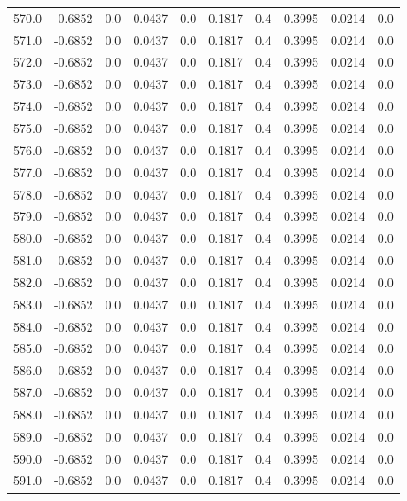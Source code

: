 \begin{longtable}{lrrrrrrrrr}
570.0 & -0.6852 & 0.0 & 0.0437 & 0.0 & 0.1817 & 0.4 & 0.3995 & 0.0214 & 0.0 \\
571.0 & -0.6852 & 0.0 & 0.0437 & 0.0 & 0.1817 & 0.4 & 0.3995 & 0.0214 & 0.0 \\
572.0 & -0.6852 & 0.0 & 0.0437 & 0.0 & 0.1817 & 0.4 & 0.3995 & 0.0214 & 0.0 \\
573.0 & -0.6852 & 0.0 & 0.0437 & 0.0 & 0.1817 & 0.4 & 0.3995 & 0.0214 & 0.0 \\
574.0 & -0.6852 & 0.0 & 0.0437 & 0.0 & 0.1817 & 0.4 & 0.3995 & 0.0214 & 0.0 \\
575.0 & -0.6852 & 0.0 & 0.0437 & 0.0 & 0.1817 & 0.4 & 0.3995 & 0.0214 & 0.0 \\
576.0 & -0.6852 & 0.0 & 0.0437 & 0.0 & 0.1817 & 0.4 & 0.3995 & 0.0214 & 0.0 \\
577.0 & -0.6852 & 0.0 & 0.0437 & 0.0 & 0.1817 & 0.4 & 0.3995 & 0.0214 & 0.0 \\
578.0 & -0.6852 & 0.0 & 0.0437 & 0.0 & 0.1817 & 0.4 & 0.3995 & 0.0214 & 0.0 \\
579.0 & -0.6852 & 0.0 & 0.0437 & 0.0 & 0.1817 & 0.4 & 0.3995 & 0.0214 & 0.0 \\
580.0 & -0.6852 & 0.0 & 0.0437 & 0.0 & 0.1817 & 0.4 & 0.3995 & 0.0214 & 0.0 \\
581.0 & -0.6852 & 0.0 & 0.0437 & 0.0 & 0.1817 & 0.4 & 0.3995 & 0.0214 & 0.0 \\
582.0 & -0.6852 & 0.0 & 0.0437 & 0.0 & 0.1817 & 0.4 & 0.3995 & 0.0214 & 0.0 \\
583.0 & -0.6852 & 0.0 & 0.0437 & 0.0 & 0.1817 & 0.4 & 0.3995 & 0.0214 & 0.0 \\
584.0 & -0.6852 & 0.0 & 0.0437 & 0.0 & 0.1817 & 0.4 & 0.3995 & 0.0214 & 0.0 \\
585.0 & -0.6852 & 0.0 & 0.0437 & 0.0 & 0.1817 & 0.4 & 0.3995 & 0.0214 & 0.0 \\
586.0 & -0.6852 & 0.0 & 0.0437 & 0.0 & 0.1817 & 0.4 & 0.3995 & 0.0214 & 0.0 \\
587.0 & -0.6852 & 0.0 & 0.0437 & 0.0 & 0.1817 & 0.4 & 0.3995 & 0.0214 & 0.0 \\
588.0 & -0.6852 & 0.0 & 0.0437 & 0.0 & 0.1817 & 0.4 & 0.3995 & 0.0214 & 0.0 \\
589.0 & -0.6852 & 0.0 & 0.0437 & 0.0 & 0.1817 & 0.4 & 0.3995 & 0.0214 & 0.0 \\
590.0 & -0.6852 & 0.0 & 0.0437 & 0.0 & 0.1817 & 0.4 & 0.3995 & 0.0214 & 0.0 \\
591.0 & -0.6852 & 0.0 & 0.0437 & 0.0 & 0.1817 & 0.4 & 0.3995 & 0.0214 & 0.0 \\

\end{longtable}
